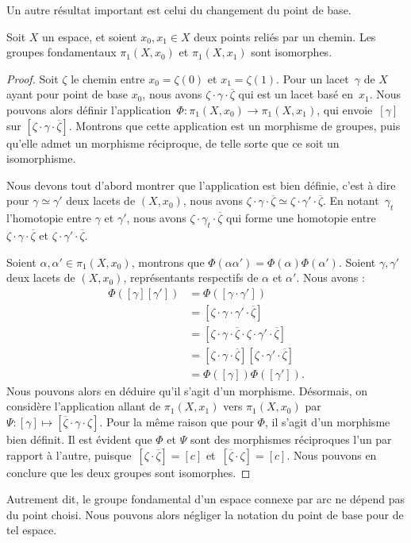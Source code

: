 Un autre résultat important est celui du changement du point de base.

\begin{proposition}
Soit $X$ un espace, et soient $x_0,x_1\in X$ deux points reliés par un chemin. Les groupes fondamentaux $\pi_1(X,x_0)$ et $\pi_1(X,x_1)$ sont isomorphes.
\end{proposition}
\begin{proof}
Soit $\zeta$ le chemin entre $x_0=\zeta(0)$ et $x_1=\zeta(1)$. Pour un lacet~$\gamma$ de $X$ ayant pour point de base $x_0$, nous avons $\zeta\cdot\gamma\cdot\overline{\zeta}$ qui est un lacet basé en~$x_1$. Nous pouvons alors définir l'application~$\Phi:\pi_1(X,x_0)\to\pi_1(X,x_1)$, qui envoie~$[\gamma]$ sur $[\zeta\cdot\gamma\cdot\overline{\zeta}]$. Montrons que cette application est un morphisme de groupes, puis qu'elle admet un morphisme réciproque, de telle sorte que ce soit un isomorphisme.

Nous devons tout d'abord montrer que l'application est bien définie, c'est à dire pour $\gamma\simeq\gamma'$ deux lacets de $(X,x_0)$, nous avons $\zeta\cdot\gamma\cdot\overline{\zeta}\simeq\zeta\cdot\gamma'\cdot\overline{\zeta}$. En notant~$\gamma_t$ l'homotopie entre $\gamma$ et $\gamma'$, nous avons $\zeta\cdot\gamma_t\cdot\overline{\zeta}$ qui forme une homotopie entre $\zeta\cdot\gamma\cdot\overline{\zeta}$ et $\zeta\cdot\gamma'\cdot\overline{\zeta}$.

\bigskip Soient $\alpha,\alpha'\in\pi_1(X,x_0)$, montrons que $\Phi(\alpha\alpha')=\Phi(\alpha)\Phi(\alpha')$. Soient $\gamma,\gamma'$ deux lacets de $(X,x_0)$, représentants respectifs de $\alpha$ et $\alpha'$. Nous avons : \[\begin{split}
\Phi([\gamma][\gamma'])&=\Phi([\gamma\cdot\gamma'])\\
&=[\zeta\cdot\gamma\cdot\gamma'\cdot\overline{\zeta}]\\
&=[\zeta\cdot\gamma\cdot\overline{\zeta}\cdot\zeta\cdot\gamma'\cdot\overline{\zeta}]\\
&=[\zeta\cdot\gamma\cdot\overline{\zeta}][\zeta\cdot\gamma'\cdot\overline{\zeta}]\\
&=\Phi([\gamma])\Phi([\gamma']).
\end{split}\] Nous pouvons alors en déduire qu'il s'agit d'un morphisme. Désormais, on considère l'application allant de $\pi_1(X,x_1)$ vers $\pi_1(X,x_0)$ par~$\Psi:[\gamma]\mapsto[\overline{\zeta}\cdot\gamma\cdot\zeta]$. Pour la même raison que pour $\Phi$, il s'agit d'un morphisme bien définit. Il est évident que $\Phi$ et $\Psi$ sont des morphismes réciproques l'un par rapport à l'autre, puisque~$[\zeta\cdot\overline{\zeta}]=[c]$ et~$[\overline{\zeta}\cdot\zeta]=[c]$. Nous pouvons en conclure que les deux groupes sont isomorphes.
\end{proof}
\begin{remark}
Autrement dit, le groupe fondamental d'un espace connexe par arc ne dépend pas du point choisi. Nous pouvons alors négliger la notation du point de base pour de tel espace.
\end{remark}

